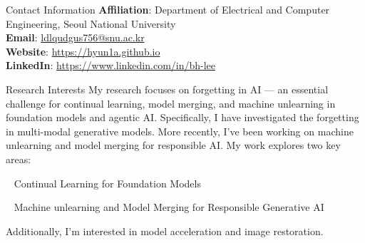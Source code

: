 \documentclass{resume} %
\begin{document}
\begin{rSection}{Contact Information}
{\bf Affiliation}: Department of Electrical and Computer Engineering, Seoul National University \\
{\bf Email}: \href{mailto:ldlqudgus756@snu.ac.kr}{ldlqudgus756@snu.ac.kr} \\
{\bf Website}: \href{https://hyun1a.github.io}{https://hyun1a.github.io} \\
{\bf LinkedIn}: \href{https://www.linkedin.com/in/bh-lee}{https://www.linkedin.com/in/bh-lee} \\
\end{rSection}


\begin{rSection}{Research Interests}
My research focuses on forgetting in AI — an essential challenge for continual learning, model merging, and machine unlearning in foundation models and agentic AI. Specifically, I have investigated the forgetting in multi-modal generative models. More recently, I've been working on machine unlearning and model merging for responsible AI. My work explores two key areas:

\textbullet~\,\,Continual Learning for Foundation Models

\textbullet~\,\,Machine unlearning and Model Merging for Responsible Generative AI


Additionally, I’m interested in model acceleration and image restoration. \\
\end{rSection}
\end{document}
